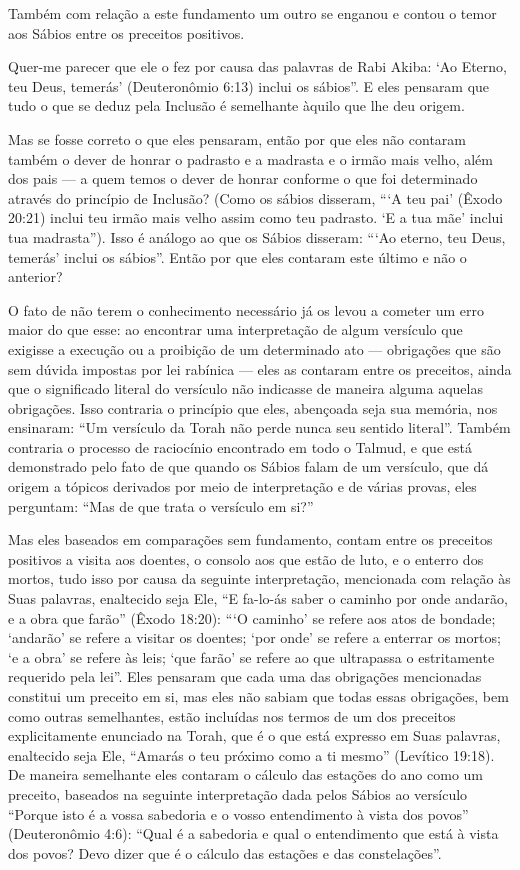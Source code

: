 Também com relação a este fundamento um outro se enganou e contou o
temor aos Sábios entre os preceitos positivos.

Quer-me parecer que ele o fez por causa das palavras de Rabi Akiba: `Ao
Eterno, teu Deus, temerás' (Deuteronômio 6:13) inclui os sábios''. E
eles pensaram que tudo o que se deduz pela Inclusão é semelhante àquilo
que lhe deu origem.

Mas se fosse correto o que eles pensaram, então por que eles não
contaram também o dever de honrar o padrasto e a madrasta e o irmão mais
velho, além dos pais --- a quem temos o dever de honrar conforme o que
foi determinado através do princípio de Inclusão? (Como os sábios
disseram, ```A teu pai' (Êxodo 20:21) inclui teu irmão mais velho assim
como teu padrasto. `E a tua mãe' inclui tua madrasta''). Isso é análogo
ao que os Sábios disseram: ```Ao eterno, teu Deus, temerás' inclui os
sábios''. Então por que eles contaram este último e não o anterior?

O fato de não terem o conhecimento necessário já os levou a cometer um
erro maior do que esse: ao encontrar uma interpretação de algum
versículo que exigisse a execução ou a proibição de um determinado ato
--- obrigações que são sem dúvida impostas por lei rabínica --- eles as
contaram entre os preceitos, ainda que o significado literal do
versículo não indicasse de maneira alguma aquelas obrigações. Isso
contraria o princípio que eles, abençoada seja sua memória, nos
ensinaram: ``Um versículo da Torah não perde nunca seu sentido
literal''. Também contraria o processo de raciocínio encontrado em todo
o Talmud, e que está demonstrado pelo fato de que quando os Sábios falam
de um versículo, que dá origem a tópicos derivados por meio de
interpretação e de várias provas, eles perguntam: ``Mas de que trata o
versículo em si?''

Mas eles baseados em comparações sem fundamento, contam entre os
preceitos positivos a visita aos doentes, o consolo aos que estão de
luto, e o enterro dos mortos, tudo isso por causa da seguinte
interpretação, mencionada com relação às Suas palavras, enaltecido seja
Ele, ``E fa-lo-ás saber o caminho por onde andarão, e a obra que
farão'' (Êxodo 18:20): ```O caminho' se refere aos atos de bondade;
`andarão' se refere a visitar os doentes; `por onde' se refere a
enterrar os mortos; `e a obra' se refere às leis; `que farão' se refere
ao que ultrapassa o estritamente requerido pela lei''. Eles pensaram que
cada uma das obrigações mencionadas constitui um preceito em si, mas
eles não sabiam que todas essas obrigações, bem como outras
semelhantes, estão incluídas nos termos de um dos preceitos
explicitamente enunciado na Torah, que é o que está expresso em Suas
palavras, enaltecido seja Ele, ``Amarás o teu próximo como a ti mesmo''
(Levítico 19:18). De maneira semelhante eles contaram o cálculo das
estações do ano como um preceito, baseados na seguinte interpretação
dada pelos Sábios ao versículo ``Porque isto é a vossa sabedoria e o
vosso entendimento à vista dos povos'' (Deuteronômio 4:6): ``Qual é a
sabedoria e qual o entendimento que está à vista dos povos? Devo dizer
que é o cálculo das estações e das constelações''.

